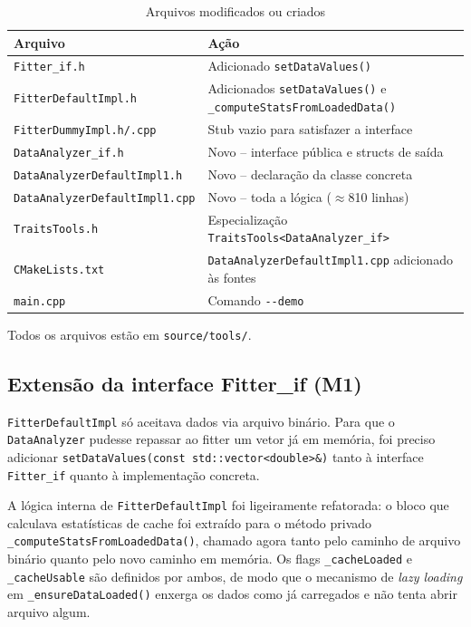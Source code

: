 \begin{table}[htbp]
\centering
\caption{Arquivos modificados ou criados}
\label{tab:arquivos}
\small
\begin{tabular}{ll}
\toprule
\textbf{Arquivo} & \textbf{Ação} \\
\midrule
\texttt{Fitter\_if.h}              & Adicionado \texttt{setDataValues()} \\
\texttt{FitterDefaultImpl.h}        & Adicionados \texttt{setDataValues()} e \texttt{\_computeStatsFromLoadedData()} \\
\texttt{FitterDummyImpl.h/.cpp}     & Stub vazio para satisfazer a interface \\
\texttt{DataAnalyzer\_if.h}         & Novo -- interface pública e structs de saída \\
\texttt{DataAnalyzerDefaultImpl1.h} & Novo -- declaração da classe concreta \\
\texttt{DataAnalyzerDefaultImpl1.cpp} & Novo -- toda a lógica ($\approx$810 linhas) \\
\texttt{TraitsTools.h}              & Especialização \texttt{TraitsTools<DataAnalyzer\_if>} \\
\texttt{CMakeLists.txt}             & \texttt{DataAnalyzerDefaultImpl1.cpp} adicionado às fontes \\
\texttt{main.cpp}                   & Comando \texttt{-{}-demo} \\
\bottomrule
\end{tabular}

\medskip
\small Todos os arquivos estão em \texttt{source/tools/}.
\end{table}

\subsection{Extensão da interface Fitter\_if (M1)}

\texttt{FitterDefaultImpl} só aceitava dados via arquivo binário. Para que o \texttt{DataAnalyzer} pudesse repassar ao fitter um vetor já em memória, foi preciso adicionar \texttt{setDataValues(const std::vector<double>\&)} tanto à interface \texttt{Fitter\_if} quanto à implementação concreta.

A lógica interna de \texttt{FitterDefaultImpl} foi ligeiramente refatorada: o bloco que calculava estatísticas de cache foi extraído para o método privado \texttt{\_computeStatsFromLoadedData()}, chamado agora tanto pelo caminho de arquivo binário quanto pelo novo caminho em memória. Os flags \texttt{\_cacheLoaded} e \texttt{\_cacheUsable} são definidos por ambos, de modo que o mecanismo de \textit{lazy loading} em \texttt{\_ensureDataLoaded()} enxerga os dados como já carregados e não tenta abrir arquivo algum.

